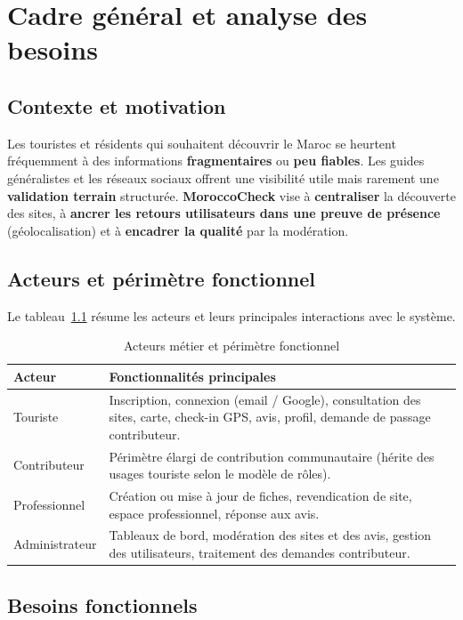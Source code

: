 \chapter{Cadre général et analyse des besoins}

\section{Contexte et motivation}

Les touristes et résidents qui souhaitent découvrir le Maroc se heurtent fréquemment à des informations \textbf{fragmentaires} ou \textbf{peu fiables}. Les guides généralistes et les réseaux sociaux offrent une visibilité utile mais rarement une \textbf{validation terrain} structurée. \textbf{MoroccoCheck} vise à \textbf{centraliser} la découverte des sites, à \textbf{ancrer les retours utilisateurs dans une preuve de présence} (géolocalisation) et à \textbf{encadrer la qualité} par la modération.

\section{Acteurs et périmètre fonctionnel}

Le tableau~\ref{tab:acteurs} résume les acteurs et leurs principales interactions avec le système.

\begin{table}[H]
\centering
\caption{Acteurs métier et périmètre fonctionnel}
\label{tab:acteurs}
\begin{tabular}{@{}p{3.2cm}p{10.5cm}@{}}
\toprule
\textbf{Acteur} & \textbf{Fonctionnalités principales} \\
\midrule
Touriste & Inscription, connexion (email / Google), consultation des sites, carte, check-in GPS, avis, profil, demande de passage contributeur. \\
Contributeur & Périmètre élargi de contribution communautaire (hérite des usages touriste selon le modèle de rôles). \\
Professionnel & Création ou mise à jour de fiches, revendication de site, espace professionnel, réponse aux avis. \\
Administrateur & Tableaux de bord, modération des sites et des avis, gestion des utilisateurs, traitement des demandes contributeur. \\
\bottomrule
\end{tabular}
\end{table}

\section{Besoins fonctionnels}

